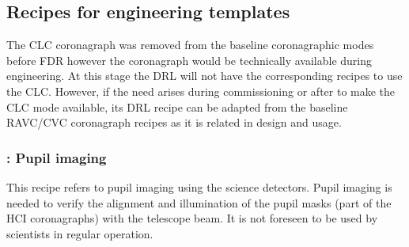 
\subsection{Recipes for engineering templates}
\label{ssec:recipes_technical}


The CLC coronagraph was removed from the baseline coronagraphic modes before FDR however the coronagraph would be technically available during engineering. At this stage the DRL will not have the corresponding recipes to use the CLC. However, if the need arises during commissioning or after to make the CLC mode available, its DRL recipe can be adapted from the baseline RAVC/CVC coronagraph recipes as it is related in design and usage.

\subsubsection{: Pupil imaging}\label{rec:metis_pupil_imaging}
\label{sssec:pupil_imaging}

This recipe refers to pupil imaging using the science detectors.
Pupil imaging is needed to verify the alignment and illumination of the pupil masks (part of the HCI coronagraphs) with the telescope beam.
It is not foreseen to be used by scientists in regular operation.





\clearpage
\clearpage
